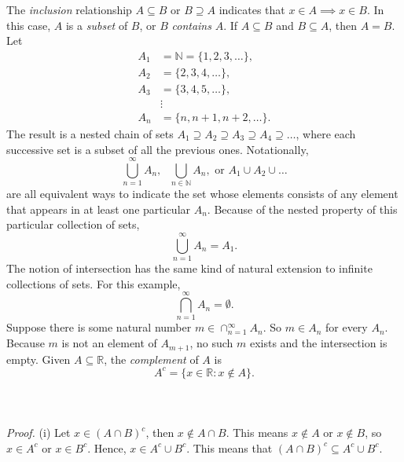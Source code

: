 \documentclass{article}
\begin{document}
    The \textit{inclusion} relationship $A \subseteq B$ or $B \supseteq A$ indicates that $x \in A \implies x \in B$. In this case, $A$ is a \textit{subset} of $B$, or $B$ \textit{contains} $A$. If $A \subseteq B$ and $B \subseteq A$, then $A = B$. Let 
    \begin{align*}
        A_1 & = \mathbb{N} = \{1,2,3,\dots\}, \\
        A_2 & = \{2,3,4,\dots\}, \\
        A_3 & = \{3,4,5,\dots\}, \\
        & \vdots
        \\
        A_n & = \{n, n+1, n+2, \dots\}.
    \end{align*}
    The result is a nested chain of sets $A_1 \supseteq A_2 \supseteq A_3 \supseteq A_4 \supseteq \dots$, where each successive set is a subset of all the previous ones. Notationally,
    \begin{equation*}
        \bigcup_{n=1}^\infty A_n, \text{ } \bigcup_{n \in \mathbb{N}} A_n, \text{ or } A_1 \cup A_2 \cup \dots
    \end{equation*}
    are all equivalent ways to indicate the set whose elements consists of any element that appears in at least one particular $A_n$. Because of the nested property of this particular collection of sets,
    \begin{equation*}
        \bigcup_{n=1}^\infty A_n = A_1.
    \end{equation*}
    The notion of intersection has the same kind of natural extension to infinite collections of sets. For this example,
    \begin{equation*}
        \bigcap_{n=1}^\infty A_n = \emptyset.
    \end{equation*}
    Suppose there is some natural number $m \in \cap_{n=1}^\infty A_n$. So $m \in A_n$ for every $A_n$. Because $m$ is not an element of $A_{m+1}$, no such $m$ exists and the intersection is empty. Given $A \subseteq \mathbb{R}$, the \textit{complement} of $A$ is
    \begin{equation*}
        A^c = \{x \in \mathbb{R}: x \notin A\}.
    \end{equation*}\\
    \\ \\
    \textit{Proof.} (i) Let $x \in (A \cap B)^c$, then $x \notin A \cap B$. This means $x \notin A$ or $x \notin B$, so $x \in A^c$ or $x \in B^c$. Hence, $x \in A^c \cup B^c$. This means that $(A \cap B)^c \subseteq A^c \cup B^c$.
    
\end{document}
